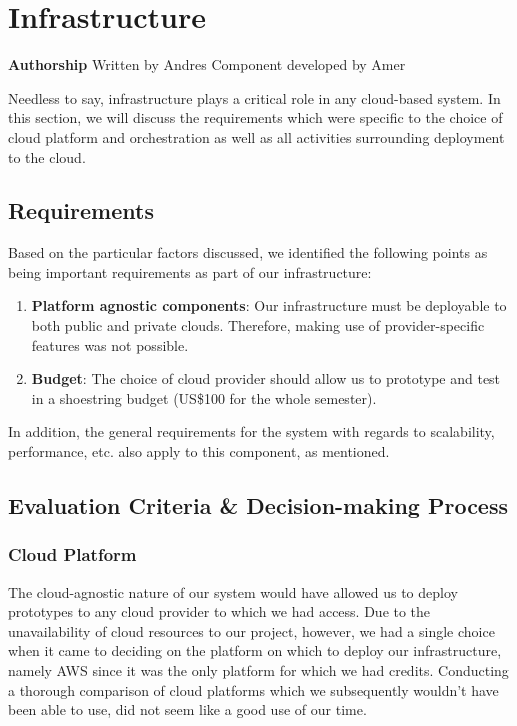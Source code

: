 \section{Infrastructure}\label{sec:infrastructure}

\textbf{Authorship} Written by Andres Component developed by Amer

Needless to say, infrastructure plays a critical role in any cloud-based
system. In this section, we will discuss the requirements which were
specific to the choice of cloud platform and orchestration as well as
all activities surrounding deployment to the cloud.

\subsection{Requirements}\label{requirements}

Based on the particular factors discussed, we identified the following
points as being important requirements as part of our infrastructure:

\begin{enumerate}
\def\labelenumi{\arabic{enumi}.}
\tightlist
\item
  \textbf{Platform agnostic components}: Our infrastructure must be
  deployable to both public and private clouds. Therefore, making use of
  provider-specific features was not possible.
\item
  \textbf{Budget}: The choice of cloud provider should allow us to
  prototype and test in a shoestring budget (US\$100 for the whole
  semester).
\end{enumerate}

In addition, the general requirements for the system with regards to
scalability, performance, etc. also apply to this component, as
mentioned.

\subsection{Evaluation Criteria \& Decision-making
Process}\label{evaluation-criteria-decision-making-process}

\subsubsection{Cloud Platform}\label{cloud-platform}

The cloud-agnostic nature of our system would have allowed us to deploy
prototypes to any cloud provider to which we had access. Due to the
unavailability of cloud resources to our project, however, we had a
single choice when it came to deciding on the platform on which to
deploy our infrastructure, namely AWS since it was the only platform for
which we had credits. Conducting a thorough comparison of cloud
platforms which we subsequently wouldn't have been able to use, did not
seem like a good use of our time.

